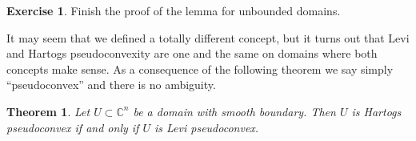 \documentclass[12pt,openany]{book}
\newcommand{\C}{{\mathbb{C}}}
\theoremstyle{plain}
\newtheorem{thm}{Theorem}[section]
\theoremstyle{remark}
\theoremstyle{definition}
\newenvironment{exbox}{%
    \def\FrameCommand{\vrule width 1pt \relax\hspace{10pt}}%
    \MakeFramed {\advance \hsize -\width \FrameRestore}%
}{%
    \endMakeFramed
}
\theoremstyle{exercise}
\newtheorem{exercise}{Exercise}[section]
\theoremstyle{example}
\begin{document}
\begin{exbox}
\begin{exercise}
Finish the proof of the lemma for unbounded domains.
\pagebreak[2]
\end{exercise}
\end{exbox}



It may seem that we defined a totally different concept, but it turns
out that Levi and Hartogs pseudoconvexity are one and the same on domains
where both concepts make sense.
As a consequence of the following theorem we say simply ``pseudoconvex'' and there
is no ambiguity.

\begin{thm}
Let $U \subset \C^n$ be a domain with smooth boundary. 
Then $U$ is Hartogs pseudoconvex if and only if $U$ is Levi pseudoconvex.
\end{thm}
\end{document}
